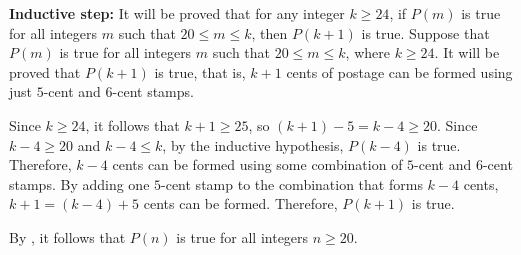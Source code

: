 \begin{enumerate}
\begin{enumerate}
\begin{subprove}
      \textbf{Inductive step:} It will be proved that for any integer \(k \geq 24\), if \(P(m)\) is true for all integers \(m\) such that \(20 \leq m \leq k\), then \(P(k+1)\) is true.
      Suppose that \(P(m)\) is true for all integers \(m\) such that \(20 \leq m \leq k\), where \(k \geq 24\).
      It will be proved that \(P(k+1)\) is true, that is, \(k+1\) cents of postage can be formed using just \(5\)-cent and \(6\)-cent stamps.
      
      Since \(k \geq 24\), it follows that \(k+1 \geq 25\), so \((k+1) - 5 = k - 4 \geq 20\).
      Since \(k - 4 \geq 20\) and \(k - 4 \leq k\), by the inductive hypothesis, \(P(k-4)\) is true.
      Therefore, \(k-4\) cents can be formed using some combination of \(5\)-cent and \(6\)-cent stamps.
      By adding one \(5\)-cent stamp to the combination that forms \(k-4\) cents, \(k+1 = (k-4) + 5\) cents can be formed.
      Therefore, \(P(k+1)\) is true.
      
      By , it follows that \(P(n)\) is true for all integers \(n \geq 20\).
      

\end{subprove}
\end{enumerate}
\end{enumerate}
